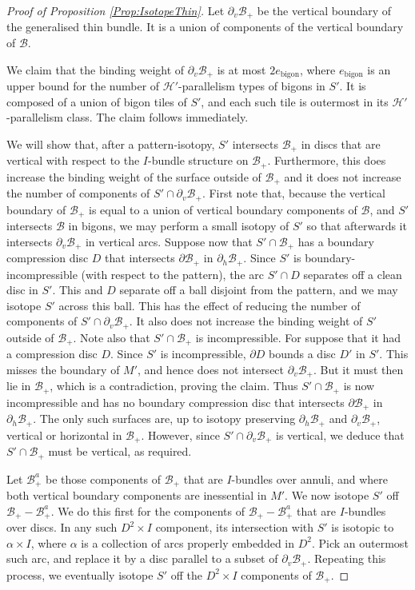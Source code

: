 \documentclass[oneside]{amsart}
\numberwithin{equation}{section}
\theoremstyle{plain}
\theoremstyle{definition}
\newcommand{\calH}{\mathcal{H}}
\newcommand{\calB}{\mathcal{B}}
\begin{document}
\begin{proof}[Proof of Proposition \ref{Prop:IsotopeThin}]
Let $\partial_v \calB_+$ be the vertical boundary of the generalised thin bundle. It is a union of components of the vertical boundary
of $\calB$. 

We claim that the binding weight of $\partial_v \calB_+$ is at most $2e_{\textrm{bigon}}$, where $e_{\textrm{bigon}}$ is an upper bound 
for the number of $\calH'$-parallelism  types of bigons in $S'$. It is composed of a union of bigon tiles of $S'$, and each such tile is
outermost in its $\calH'$-parallelism class. The claim follows immediately.

We will show that, after a pattern-isotopy, $S'$ intersects $\calB_+$ in discs that are vertical with respect to the $I$-bundle structure on $\calB_+$.
Furthermore, this does increase the binding weight of the surface outside of $\calB_+$ and it does not increase the number
of components of $S' \cap \partial_v \calB_+$.
First note that, because the vertical boundary of $\calB_+$ is equal to a union of vertical boundary components of
$\calB$, and $S'$ intersects $\mathcal{B}$ in bigons, we may perform a small isotopy of $S'$ so that afterwards it intersects $\partial_v \calB_+$ in vertical arcs. 
Suppose now that $S' \cap \calB_+$ has a boundary compression disc $D$ that intersects $\partial \calB_+$ in $\partial_h \calB_+$.
Since $S'$ is boundary-incompressible (with respect to the pattern), the arc $S' \cap D$ separates off a clean 
disc in $S'$. This and $D$ separate off a ball disjoint from the pattern, and we may isotope
$S'$ across this ball. This has the effect of reducing the number of components of $S' \cap \partial_v \calB_+$.
It also does not increase the binding weight of $S'$ outside of $\calB_+$.
Note also that $S' \cap \calB_+$ is incompressible. For suppose that it had a compression
disc $D$. Since $S'$ is incompressible, $\partial D$ bounds a disc $D'$ in $S'$.
This misses the boundary of $M'$, and hence does not intersect $\partial_v \calB_+$. But it must then
lie in $\calB_+$, which is a contradiction, proving the claim. 
Thus $S' \cap \calB_+$ is now incompressible and has no boundary compression disc
that intersects $\partial \calB_+$ in $\partial_h \calB_+$. The only such surfaces are, up to isotopy
preserving $\partial_h \calB_+$ and $\partial_v \calB_+$, vertical or horizontal in $\calB_+$. However, since $S' \cap \partial_v \calB_+$
is vertical, we deduce that $S' \cap \calB_+$ must be vertical, as required.

Let $\calB^a_+$ be those components of $\calB_+$ that are $I$-bundles over annuli, and where
both vertical boundary components are inessential in $M'$.
We now isotope $S'$ off $\calB_+ - \calB^a_+$. We do this first for the components of $\calB_+- \calB^a_+$ that are $I$-bundles over discs.
In any such $D^2 \times I$ component, its intersection with $S'$ is isotopic to $\alpha \times I$, where $\alpha$ is a collection of
arcs properly embedded in $D^2$. Pick an outermost such arc, and replace it by a disc parallel to 
a subset of $\partial_v \calB_+$. Repeating this process, we eventually isotope $S'$ off the $D^2 \times I$
components of $\calB_+$.


\end{proof}
\end{document}
